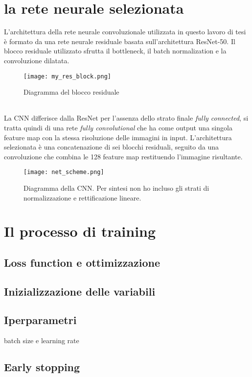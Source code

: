 \section{la rete neurale selezionata}
L'architettura della rete neurale convoluzionale utilizzata in questo lavoro di tesi è formato da una rete neurale residuale basata sull'architettura ResNet-50. Il blocco residuale utilizzato sfrutta il bottleneck, il batch normalization e la convoluzione dilatata.
\begin{figure}[ht]
    \centering
    \texttt{[image: my\_res\_block.png]}
    \caption[Diagramma del blocco residuale]{Diagramma del blocco residuale}
\end{figure}\\
La CNN differisce dalla ResNet per l'assenza dello strato finale \textit{fully connected}, si tratta quindi di una rete \textit{fully convolutional} che ha come output una singola feature map con la stessa risoluzione delle immagini in input. L'architettura selezionata è una concatenazione di sei blocchi residuali, seguito da una convoluzione che combina le 128 feature map restituendo l'immagine risultante.
\begin{figure}[ht]
    \centering
    \texttt{[image: net\_scheme.png]}
    \caption[Architettura della CNN]{Diagramma della CNN. Per sintesi non ho incluso gli strati di normalizzazione e rettificazione lineare.}
\end{figure}

\section{Il processo di training}
\subsection{Loss function e ottimizzazione}

\subsection{Inizializzazione delle variabili}
\subsection{Iperparametri}
batch size e learning rate
\subsection{Early stopping}